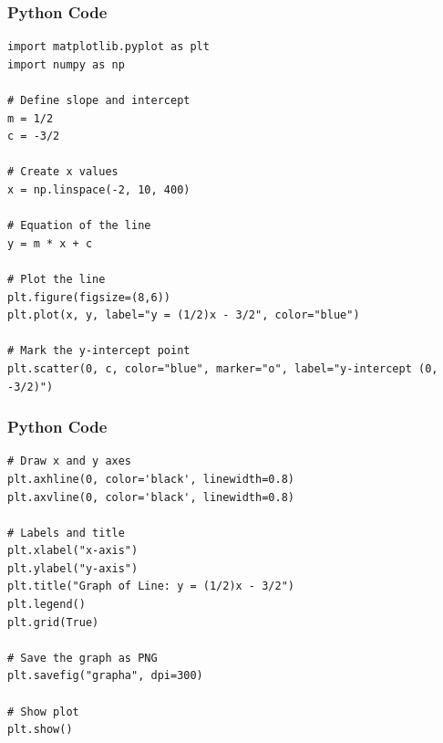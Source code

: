 \documentclass{beamer}
\begin{document}
\begin{frame}[fragile]
    \frametitle{Python Code}
    \begin{lstlisting}
import matplotlib.pyplot as plt
import numpy as np

# Define slope and intercept
m = 1/2
c = -3/2

# Create x values
x = np.linspace(-2, 10, 400)

# Equation of the line
y = m * x + c

# Plot the line
plt.figure(figsize=(8,6))
plt.plot(x, y, label="y = (1/2)x - 3/2", color="blue")

# Mark the y-intercept point
plt.scatter(0, c, color="blue", marker="o", label="y-intercept (0, -3/2)")

\end{lstlisting}
\end{frame}

\begin{frame}[fragile]
    \frametitle{Python Code }

    \begin{lstlisting}
# Draw x and y axes
plt.axhline(0, color='black', linewidth=0.8)
plt.axvline(0, color='black', linewidth=0.8)

# Labels and title
plt.xlabel("x-axis")
plt.ylabel("y-axis")
plt.title("Graph of Line: y = (1/2)x - 3/2")
plt.legend()
plt.grid(True)

# Save the graph as PNG
plt.savefig("grapha", dpi=300)

# Show plot
plt.show()


    \end{lstlisting}
\end{frame}
\end{document}
